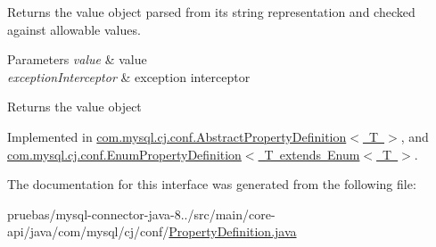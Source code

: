 Returns the value object parsed from it\textquotesingle{}s string representation and checked against allowable values.


\begin{DoxyParams}{Parameters}
{\em value} & value \\
\hline
{\em exception\+Interceptor} & exception interceptor\\
\hline
\end{DoxyParams}
\begin{DoxyReturn}{Returns}
the value object 
\end{DoxyReturn}


Implemented in \mbox{\hyperlink{classcom_1_1mysql_1_1cj_1_1conf_1_1_abstract_property_definition_aa8a990e4882d80051332cacda3886747}{com.\+mysql.\+cj.\+conf.\+Abstract\+Property\+Definition$<$ T $>$}}, and \mbox{\hyperlink{classcom_1_1mysql_1_1cj_1_1conf_1_1_enum_property_definition_a00a259a5d83a0a7c6522309ff44146ba}{com.\+mysql.\+cj.\+conf.\+Enum\+Property\+Definition$<$ T extends Enum$<$ T $>$}}.



The documentation for this interface was generated from the following file\+:\begin{DoxyCompactItemize}
\item 
pruebas/mysql-\/connector-\/java-\/8../src/main/core-\/api/java/com/mysql/cj/conf/\mbox{\hyperlink{_property_definition_8java}{Property\+Definition.\+java}}\end{DoxyCompactItemize}
